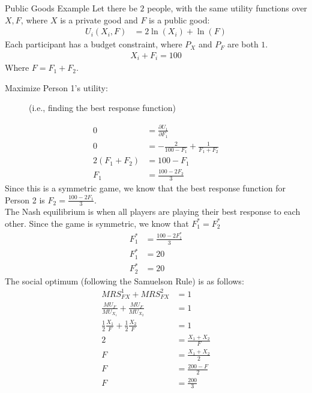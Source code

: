 \documentclass[10pt]{extarticle}
\begin{document}
  \begin{problem}{Public Goods Example}
    Let there be $2$ people, with the same utility functions over $X,F$, where $X$ is a private good and $F$ is a public good:
    \begin{align*}
      U_i(X_i,F) &= 2\ln(X_i) + \ln(F)\tag*{for $i=1,2$}
    \end{align*}
    Each participant has a budget constraint, where $P_X$ and $P_F$ are both $1$.
    \begin{align*}
      X_i + F_i = 100\tag*{for $i=1,2$}
    \end{align*}
    Where $F = F_1 + F_2$.
    \begin{description}
      \item[Maximize Person 1's utility:] (i.e., finding the best response function)
    \end{description}
    \begin{align*}
      0 &= \frac{\partial U_1}{\partial F_1}\\
      0 &= -\frac{2}{100-F_1} + \frac{1}{F_1 + F_2}\tag*{recall that $X_1 = 100-F_1$}\\
      2(F_1 + F_2) &= 100-F_1\\
      F_1 &= \frac{100-2F_2}{3}
    \end{align*}
    Since this is a symmetric game, we know that the best response function for Person 2 is $F_2 = \frac{100-2F_1}{3}$.\\

    The Nash equilibrium is when all players are playing their best response to each other. Since the game is symmetric, we know that $F_1^* = F_2^*$
    \begin{align*}
      F_1^* &= \frac{100-2F_1^*}{3}\\
      F_1^* &= 20\\
      F_2^* &= 20
    \end{align*}
    The social optimum (following the Samuelson Rule) is as follows:
    \begin{align*}
      MRS_{FX}^1 + MRS_{FX}^2 &= 1\\
      \frac{MU_F}{MU_{X_1}} + \frac{MU_F}{MU_{X_2}}  &= 1\\
      \frac{1}{2}\frac{X_1}{F} + \frac{1}{2}\frac{X_2}{F} &= 1\\
      2 &= \frac{X_1 + X_2}{F}\\
      F &= \frac{X_1 + X_2}{2}\\
      F &= \frac{200-F}{2}\\
      F &= \frac{200}{3}
    \end{align*}
  \end{problem}
\end{document}
